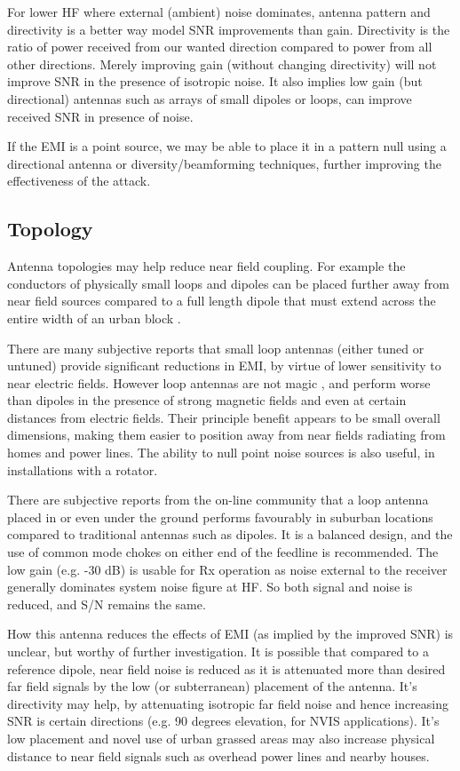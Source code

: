 \documentclass{article}
\begin{document}
For lower HF where external (ambient) noise dominates, antenna pattern and directivity \cite{w8ji_directivity} is a better way model SNR improvements than gain.  Directivity is the ratio of power received from our wanted direction compared to power from all other directions. Merely improving gain (without changing directivity) will not improve SNR in the presence of isotropic noise.  It also implies low gain (but directional) antennas such as arrays of small dipoles or loops, can improve received SNR in presence of noise.

If the EMI is a point source, we may be able to place it in a pattern null using a directional antenna or diversity/beamforming techniques, further improving the effectiveness of the attack.

\subsection{Topology}

Antenna topologies may help reduce near field coupling.  For example the conductors of physically small loops and dipoles can be placed further away from near field sources compared to a full length dipole that must extend across the entire width of an urban block \cite{lz1aq}.

There are many subjective reports that small loop antennas (either tuned or untuned) provide significant reductions in EMI, by virtue of lower sensitivity to near electric fields.  However loop antennas are not magic \cite{w8ji_radio_noise}, and perform worse than dipoles in the presence of strong magnetic fields and even at certain distances from electric fields.  Their principle benefit appears to be small overall dimensions, making them easier to position away from near fields radiating from homes and power lines. The ability to null point noise sources is also useful, in installations with a rotator.

There are subjective reports from the on-line community that a loop antenna placed in or even under the ground \cite{k5jy_log}\cite{duffy_lig} performs favourably in suburban locations compared to traditional antennas such as dipoles. It is a balanced design, and the use of common mode chokes on either end of the feedline is recommended. The low gain (e.g. -30 dB) is usable for Rx operation as noise external to the receiver generally dominates system noise figure at HF. So both signal and noise is reduced, and S/N remains the same.

How this antenna reduces the effects of EMI (as implied by the improved SNR) is unclear, but worthy of further investigation. It is possible that compared to a reference dipole, near field noise is reduced as it is attenuated more than desired far field signals by the low (or subterranean) placement of the antenna.  It's directivity may help, by attenuating isotropic far field noise and hence increasing SNR is certain directions (e.g. 90 degrees elevation, for NVIS applications).  It's low placement and novel use of urban grassed areas may also increase physical distance to near field signals such as overhead power lines and nearby houses.
\end{document}
